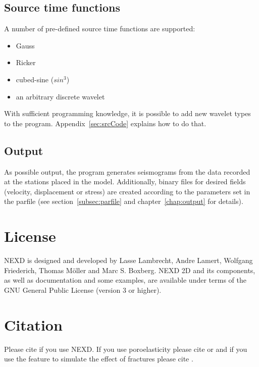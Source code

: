     \subsection{Source time functions}  
    A number of pre-defined source time functions are supported:
    \begin{itemize}
        \item Gauss
        \item Ricker
        \item cubed-sine ($sin^3$)
        \item an arbitrary discrete wavelet
    \end{itemize}       
    With sufficient programming knowledge, it is possible to add new wavelet types to the program. Appendix~\ref{sec:srcCode} explains how to do that.   
      
    \subsection{Output}
    As possible output, the program generates seismograms from the data recorded at the stations placed in the model. Additionally, binary files for desired fields (velocity, displacement or stress) are created according to the parameters set in the parfile (see section~\ref{subsec:parfile} and chapter~\ref{chap:output} for details).
			     
\section{License}
NEXD is designed and developed by Lasse Lambrecht, Andre Lamert, Wolfgang Friederich, Thomas M{\"o}ller and Marc S. Boxberg. NEXD 2D and its components, as well as documentation and some examples, are available under terms of the GNU General Public License (version 3 or higher).

\section{Citation}
Please cite \cite{Lambrecht.2017} if you use NEXD. If you use poroelasticity please cite \cite{Boxberg.2017} or \cite{Boxberg.2019} and if you use the feature to simulate the effect of fractures please cite \cite{Moeller.2019}.